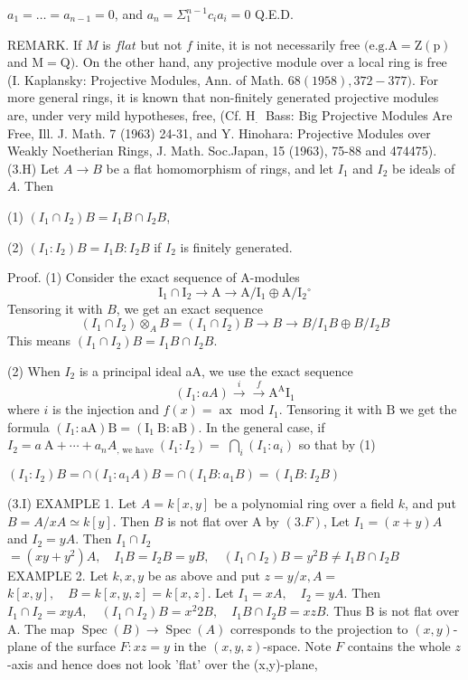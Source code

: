 $a_{1}=\ldots=a_{n-1}=0$, and $a_{n}=\Sigma_{1}^{n-1} c_{i} a_{i}=0$ Q.E.D.

REMARK. If $M$ is $f l a t$ but not $f$ inite, it is not necessarily free $(\mathrm{e} . \mathrm{g} . \mathrm{A}=\mathrm{Z}(\mathrm{p})$ and $\mathrm{M}=\mathrm{Q})$. On the other hand, any projective module over a local ring is free (I. Kaplansky: Projective Modules, Ann. of Math. $68(1958), 372-377)$. For more general rings, it is known that non-finitely generated projective modules are, under very mild hypotheses, free, (Cf. $\mathrm{H}_{\text {. }}$ Bass: Big Projective Modules Are Free, Ill. J. Math. 7 (1963) 24-31, and $\mathrm{Y}$. Hinohara: Projective Modules over Weakly Noetherian Rings, J. Math. Soc.Japan, 15 (1963), 75-88 and 474475). (3.H) Let $A \rightarrow B$ be a flat homomorphism of rings, and let $I_{1}$ and $I_{2}$ be ideals of $A$. Then

(1) $\left(I_{1} \cap I_{2}\right) B=I_{1} B \cap I_{2} B$,

(2) $\left(I_{1}: I_{2}\right) B=I_{1} B: I_{2} B$ if $I_{2}$ is finitely generated.

Proof. (1) Consider the exact sequence of A-modules
$$
\mathrm{I}_{1} \cap \mathrm{I}_{2} \rightarrow \mathrm{A} \rightarrow \mathrm{A} / \mathrm{I}_{1} \oplus \mathrm{A} / \mathrm{I}_{2}{ }^{\circ}
$$
Tensoring it with $B$, we get an exact sequence
$$
\left(I_{1} \cap I_{2}\right) \otimes_{A} B=\left(I_{1} \cap I_{2}\right) B \rightarrow B \rightarrow B / I_{1} B \oplus B / I_{2} B
$$
This means $\left(I_{1} \cap I_{2}\right) B=I_{1} B \cap I_{2} B$.

(2) When $I_{2}$ is a principal ideal aA, we use the exact sequence
$$
\left(I_{1}: a A\right) \stackrel{i}{\rightarrow} \stackrel{f}{\rightarrow} \mathrm{A}^{\mathrm{A}} \mathrm{I}_{1}
$$
where $i$ is the injection and $f(x)=\operatorname{ax}$ mod $I_{1}$. Tensoring it with $\mathrm{B}$ we get the formula $\left(I_{1}: \mathrm{aA}\right) \mathrm{B}=\left(\mathrm{I}_{1} \mathrm{~B}: \mathrm{aB}\right)$. In the general case, if $I_{2}=a \mathrm{~A}+\cdots+a_{n} A_{\text {, we have }}\left(I_{1}: I_{2}\right)=$ $\bigcap_{i}\left(I_{1}: a_{i}\right)$ so that by (1)

$\left(I_{1}: I_{2}\right) B=\cap\left(I_{1}: a_{1} A\right) B=\cap\left(I_{1} B: a_{1} B\right)=\left(I_{1} B: I_{2} B\right)$

(3.I) EXAMPLE 1. Let $A=k[x, y]$ be a polynomial ring over a field $k$, and put $B=A / x A \simeq k[y]$. Then $B$ is not flat over A by $(3 . F)$, Let $I_{1}=(x+y) A$ and $I_{2}=y A$. Then $I_{1} \cap I_{2}$ $=\left(x y+y^{2}\right) A, \quad I_{1} B=I_{2} B=y B, \quad\left(I_{1} \cap I_{2}\right) B=y^{2} B \neq I_{1} B \cap I_{2} B$ EXAMPLE 2. Let $k, x, y$ be as above and put $z=y / x, A=$ $k[x, y], \quad B=k[x, y, z]=k[x, z]$. Let $I_{1}=x A, \quad I_{2}=y A$. Then $I_{1} \cap I_{2}=x y A, \quad\left(I_{1} \cap I_{2}\right) B=x^{2} 2 B, \quad I_{1} B \cap I_{2} B=x z B$. Thus B is not flat over A. The map $\operatorname{Spec}(B) \rightarrow \operatorname{Spec}(A)$ corresponds to the projection to $(x, y)$-plane of the surface $F: x z=y$ in the $(x, y, z)$-space. Note $F$ contains the whole $z$-axis and hence does not look 'flat' over the (x,y)-plane,

